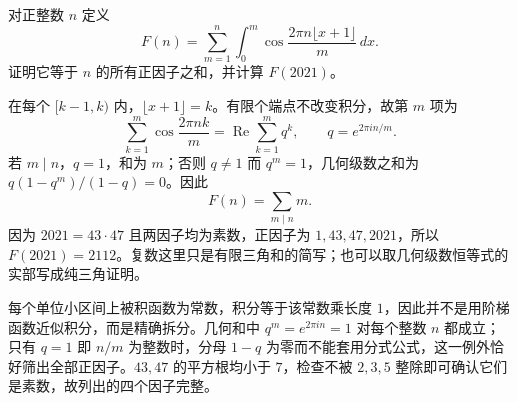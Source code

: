 \documentclass[12pt,fontset=fandol]{ctexart}
\begin{document}
\begin{example}\label{nm-2020-6}
对正整数 $n$ 定义
\[
 F(n)=\sum_{m=1}^n\int_0^m\cos\frac{2\pi n\lfloor x+1\rfloor}{m}\,dx.
\]
证明它等于 $n$ 的所有正因子之和，并计算 $F(2021)$。
\end{example}
\begin{solve}
在每个 $[k-1,k)$ 内，$\lfloor x+1\rfloor=k$。有限个端点不改变积分，故第 $m$ 项为
\[
 \sum_{k=1}^m\cos\frac{2\pi nk}{m}
 =\operatorname{Re}\sum_{k=1}^m q^k,
 \qquad q=e^{2\pi i n/m}.
\]
若 $m\mid n$，$q=1$，和为 $m$；否则 $q\ne1$ 而 $q^m=1$，几何级数之和为 $q(1-q^m)/(1-q)=0$。因此
\[
 F(n)=\sum_{m\mid n}m.
\]
因为 $2021=43\cdot47$ 且两因子均为素数，正因子为 $1,43,47,2021$，所以 $F(2021)=2112$。复数这里只是有限三角和的简写；也可以取几何级数恒等式的实部写成纯三角证明。

每个单位小区间上被积函数为常数，积分等于该常数乘长度 $1$，因此并不是用阶梯函数近似积分，而是精确拆分。几何和中 $q^m=e^{2\pi in}=1$ 对每个整数 $n$ 都成立；只有 $q=1$ 即 $n/m$ 为整数时，分母 $1-q$ 为零而不能套用分式公式，这一例外恰好筛出全部正因子。$43,47$ 的平方根均小于 $7$，检查不被 $2,3,5$ 整除即可确认它们是素数，故列出的四个因子完整。

\end{solve}
\end{document}
